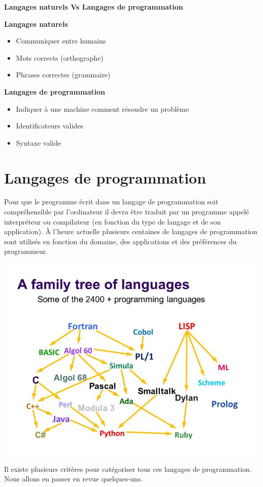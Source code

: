 \begin{eclairage}
	\textbf{Langages naturels Vs Langages de programmation} 
	\begin{multicols}{2}
		\textbf{Langages naturels}
		\begin{itemize}
			\item Communiquer entre humains
			\item Mots corrects (orthographe)
			\item Phrases correctes (grammaire)
		\end{itemize}
		\newpage
		\textbf{Langages de programmation}
		\begin{itemize}
			\item Indiquer à une machine comment résoudre un problème
			\item Identificateurs valides
			\item Syntaxe valide
		\end{itemize}
	\end{multicols}
\end{eclairage}



\section{Langages de programmation}
Pour que le programme écrit dans un langage de programmation soit compréhensible par l'ordinateur il devra être traduit par un programme appelé interpréteur ou compilateur (en fonction du type de langage et de son application). À l'heure actuelle plusieurs centaines de langages de programmation sont utilisés en fonction du domaine, des applications et des préférences du programmeur.
\begin{center}
	\includegraphics[scale=0.45,trim=0 40 0  160,clip=true]{Images/family_tree_languages}
\end{center}
Il existe plusieurs critères pour catégoriser tous ces langages de programmation. Nous allons en passer en revue quelques-uns.

